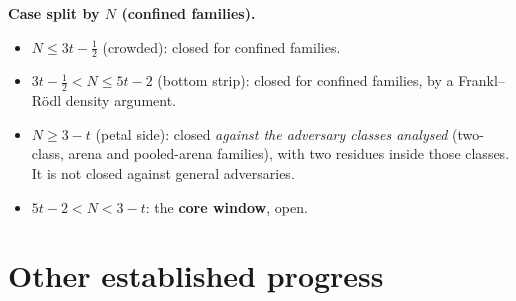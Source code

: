 \documentclass[11pt]{article}
\begin{document}
\textbf{Case split by $N$ (confined families).}
\begin{itemize}
\item $N\le 3t-\tfrac12$ (crowded): closed for confined families.
\item $3t-\tfrac12<N\le 5t-2$ (bottom strip): closed for confined families, by a Frankl--R\"odl density argument.
\item $N\ge 3-t$ (petal side): closed \emph{against the adversary classes analysed} (two-class, arena and pooled-arena
families), with two residues inside those classes. It is not closed against general adversaries.
\item $5t-2<N<3-t$: the \textbf{core window}, open.
\end{itemize}

\section{Other established progress}
\end{document}
